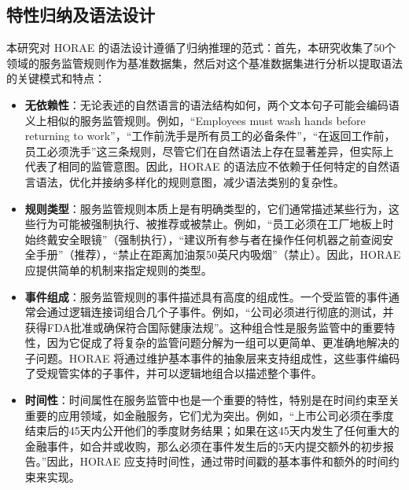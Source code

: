 \subsection{特性归纳及语法设计}

本研究对 HORAE 的语法设计遵循了归纳推理的范式：首先，本研究收集了50个领域的服务监管规则作为基准数据集，然后对这个基准数据集进行分析以提取语法的关键模式和特点：

\begin{itemize}
    \item \textbf{无依赖性}：无论表述的自然语言的语法结构如何，两个文本句子可能会编码语义上相似的服务监管规则。例如，“Employees must wash hands before returning to work”，“工作前洗手是所有员工的必备条件”，“在返回工作前，员工必须洗手”这三条规则，尽管它们在自然语法上存在显著差异，但实际上代表了相同的监管意图。因此，HORAE 的语法应不依赖于任何特定的自然语言语法，优化并接纳多样化的规则意图，减少语法类别的复杂性。
    \item \textbf{规则类型}：服务监管规则本质上是有明确类型的，它们通常描述某些行为，这些行为可能被强制执行、被推荐或被禁止。例如，“员工必须在工厂地板上时始终戴安全眼镜”（强制执行），“建议所有参与者在操作任何机器之前查阅安全手册”（推荐），“禁止在距离加油泵50英尺内吸烟”（禁止）。因此，HORAE 应提供简单的机制来指定规则的类型。
    \item \textbf{事件组成}：服务监管规则的事件描述具有高度的组成性。一个受监管的事件通常会通过逻辑连接词组合几个子事件。例如，“公司必须进行彻底的测试，并获得FDA批准或确保符合国际健康法规”。这种组合性是服务监管中的重要特性，因为它促成了将复杂的监管问题分解为一组可以更简单、更准确地解决的子问题。HORAE 将通过维护基本事件的抽象层来支持组成性，这些事件编码了受规管实体的子事件，并可以逻辑地组合以描述整个事件。
    \item \textbf{时间性}：时间属性在服务监管中也是一个重要的特性，特别是在时间约束至关重要的应用领域，如金融服务，它们尤为突出。例如，“上市公司必须在季度结束后的45天内公开他们的季度财务结果；如果在这45天内发生了任何重大的金融事件，如合并或收购，那么必须在事件发生后的5天内提交额外的初步报告。”因此，HORAE 应支持时间性，通过带时间戳的基本事件和额外的时间约束来实现。
\end{itemize}

